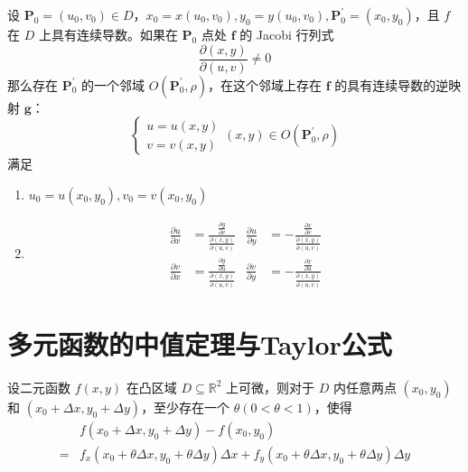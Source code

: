 \documentclass{ctexbook}
\begin{document}
\begin{theorem}[逆映射定理]
    设 $\boldsymbol{P}_0=(u_0,v_0)\in D$，$x_0=x(u_0,v_0),y_0=y(u_0,v_0),\boldsymbol{P}_0^\prime =(x_0,y_0)$，且 $f$ 在 $D$ 上具有连续导数。如果在 $\boldsymbol{P}_0$ 点处 $\boldsymbol{f}$ 的 Jacobi 行列式
    \begin{equation}
        \frac{\partial (x,y)}{\partial (u,v)}\neq 0
    \end{equation}
    那么存在 $\boldsymbol{P}_0^\prime$ 的一个邻域 $O(\boldsymbol{P}_0^\prime,\rho)$，在这个邻域上存在 $\boldsymbol{f}$ 的具有连续导数的逆映射 $\boldsymbol{g}$：
    \begin{equation}
        \begin{cases}
            u=u(x,y)\\
            v=v(x,y)
        \end{cases}
        (x,y)\in O(\boldsymbol{P}_0^\prime,\rho)
    \end{equation}
    满足
    \begin{enumerate}
        \item $u_0=u(x_0,y_0),v_0=v(x_0,y_0)$
        \item \begin{equation}
            \begin{aligned}
                \frac{\partial u}{\partial x}&=\frac{\frac{\partial y}{\partial v}}{\frac{\partial (x,y)}{\partial (u,v)}} & \frac{\partial u}{\partial y}&=-\frac{\frac{\partial x}{\partial v}}{\frac{\partial (x,y)}{\partial (u,v)}}\\
                \frac{\partial v}{\partial x}&=\frac{\frac{\partial y}{\partial u}}{\frac{\partial (x,y)}{\partial (u,v)}} & \frac{\partial v}{\partial y}&=-\frac{\frac{\partial x}{\partial u}}{\frac{\partial (x,y)}{\partial (u,v)}}
            \end{aligned}
        \end{equation}
    \end{enumerate}
\end{theorem}

\section{多元函数的中值定理与Taylor公式}

\begin{theorem}[多元函数的中值定理]
    设二元函数 $f(x,y)$ 在凸区域 $D\subseteq \mathbb{R}^2$ 上可微，则对于 $D$ 内任意两点 $(x_0,y_0)$ 和 $(x_0+\Delta x,y_0+\Delta y)$，至少存在一个 $\theta(0<\theta<1)$，使得
    \begin{equation}
        \begin{aligned}
            &f(x_0+\Delta x,y_0+\Delta y)-f(x_0,y_0) \\            
           =&f_x(x_0+\theta\Delta x,y_0+\theta\Delta y)\Delta x+f_y(x_0+\theta\Delta x,y_0+\theta\Delta y)\Delta y
        \end{aligned}
    \end{equation}
\end{theorem}
\end{document}
